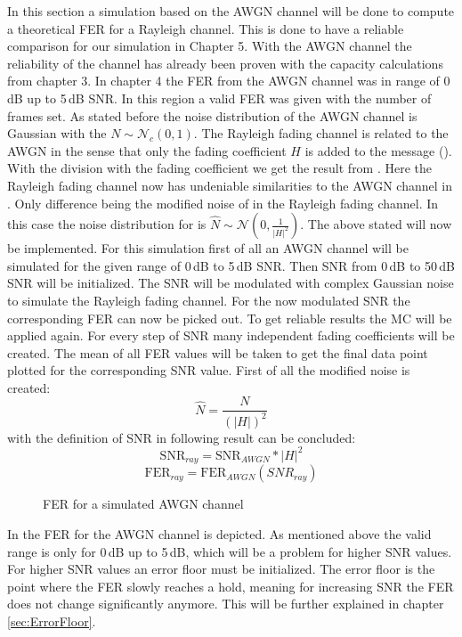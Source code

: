 In this section a simulation based on the AWGN channel will be done to compute a theoretical \gls{FER} for a Rayleigh channel. This is done to have a reliable comparison for our simulation in Chapter 5. 
With the AWGN channel the reliability of the channel has already been proven with the capacity calculations from chapter 3. In chapter 4 the \gls{FER} from the AWGN channel was in range of 0\,dB up to 5\,dB SNR. In this region a valid \gls{FER} was given with the number of frames set.
As stated before the noise distribution of the \gls{AWGN} channel is Gaussian with the $N\sim\mathcal{N}_c(0,1)$. 
The Rayleigh fading channel is related to the \gls{AWGN} in the sense that only the fading coefficient $H$ is added to the message (). With the division with the fading coefficient we get the result from . Here the Rayleigh fading channel now has undeniable similarities to the \gls{AWGN} channel in . Only difference being the modified noise of in the Rayleigh fading channel. In this case the noise distribution for  is $\hat{N}\sim\mathcal{N}(0,\frac{1}{{\lvert H \rvert}^2})$.
\newline
The above stated will now be implemented. For this simulation first of all an AWGN channel will be simulated for the given range of 0\,dB to 5\,dB SNR. Then SNR from 0\,dB to 50\,dB SNR will be initialized. The SNR will be modulated with complex Gaussian noise to simulate the Rayleigh fading channel. For the now modulated SNR the corresponding \gls{FER} can now be picked out. To get reliable results the \gls{MC} will be applied again. For every step of SNR many independent fading coefficients will be created. The mean of all \gls{FER} values will be taken to get the final data point plotted for the corresponding \gls{SNR} value.  
First of all the modified noise is created:  
\begin{equation}
\hat{N} = \frac{N}{(\lvert{H}\rvert)^2}
\end{equation}
with the definition of SNR in  following result can be concluded:
\begin{equation}
\textrm{SNR}_{ray} = \textrm{SNR}_{AWGN} * {\lvert{H}\rvert}^2
\end{equation}
\begin{equation}
\textrm{FER}_{ray} = \textrm{FER}_{AWGN}(SNR_{ray})
\end{equation}

\begin{figure}[!htb]
	\setlength{}
	\setlength\fheight{0.4\textheight}
    \centering
    
    \caption{FER for a simulated AWGN channel}
    \label{fig:FERAWGN}
\end{figure}
In  the \gls{FER} for the AWGN channel is depicted. As mentioned above the valid range is only for 0\,dB up to 5\,dB, which will be a problem for higher \gls{SNR} values. For higher SNR values an error floor must be initialized. The error floor is the point where the \gls{FER} slowly reaches a hold, meaning for increasing \gls{SNR} the \gls{FER} does not change significantly anymore. This will be further explained in chapter \ref{sec:ErrorFloor}.

